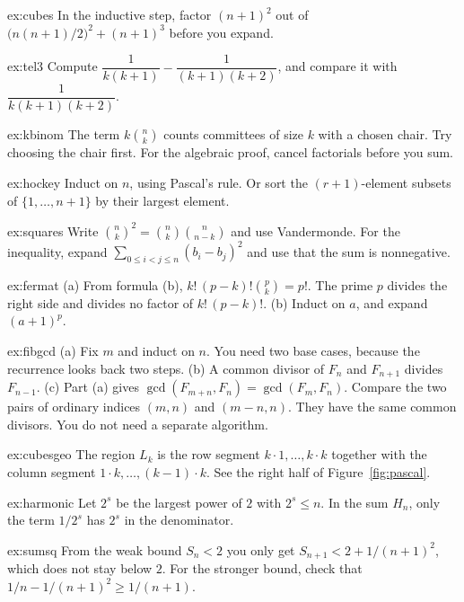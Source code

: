 \begin{hint}{ex:cubes}
In the inductive step, factor $(n+1)^2$ out of $\bigl(n(n+1)/2\bigr)^2+(n+1)^3$ before you expand.
\end{hint}
\begin{hint}{ex:tel3}
Compute $\dfrac1{k(k+1)}-\dfrac1{(k+1)(k+2)}$, and compare it with $\dfrac1{k(k+1)(k+2)}$.
\end{hint}
\begin{hint}{ex:kbinom}
The term $k\binom nk$ counts committees of size $k$ with a chosen chair. Try choosing the chair first. For the algebraic proof, cancel factorials before you sum.
\end{hint}
\begin{hint}{ex:hockey}
Induct on $n$, using Pascal's rule. Or sort the $(r+1)$-element subsets of $\{1,\dots,n+1\}$ by their largest element.
\end{hint}
\begin{hint}{ex:squares}
Write $\binom nk^2=\binom nk\binom n{n-k}$ and use Vandermonde. For the inequality, expand $\sum_{0\le i<j\le n}(b_i-b_j)^2$ and use that the sum is nonnegative.
\end{hint}
\begin{hint}{ex:fermat}
(a) From formula (b), $k!\,(p-k)!\binom pk=p!$. The prime $p$ divides the right side and divides no factor of $k!\,(p-k)!$. (b) Induct on $a$, and expand $(a+1)^p$.
\end{hint}
\begin{hint}{ex:fibgcd}
(a) Fix $m$ and induct on $n$. You need two base cases, because the recurrence looks back two steps. (b) A common divisor of $F_n$ and $F_{n+1}$ divides $F_{n-1}$. (c) Part (a) gives $\gcd(F_{m+n},F_n)=\gcd(F_m,F_n)$. Compare the two pairs of ordinary indices $(m,n)$ and $(m-n,n)$. They have the same common divisors. You do not need a separate algorithm.
\end{hint}
\begin{hint}{ex:cubesgeo}
The region $L_k$ is the row segment $k\cdot1,\dots,k\cdot k$ together with the column segment $1\cdot k,\dots,(k-1)\cdot k$. See the right half of Figure~\ref{fig:pascal}.
\end{hint}
\begin{hint}{ex:harmonic}
Let $2^s$ be the largest power of $2$ with $2^s\le n$. In the sum $H_n$, only the term $1/2^s$ has $2^s$ in the denominator.
\end{hint}
\begin{hint}{ex:sumsq}
From the weak bound $S_n<2$ you only get $S_{n+1}<2+1/(n+1)^2$, which does not stay below $2$. For the stronger bound, check that $1/n-1/(n+1)^2\ge1/(n+1)$.
\end{hint}
